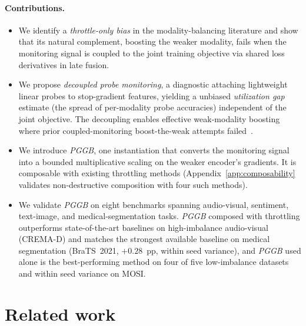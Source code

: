 \documentclass{article}
\begin{document}
\paragraph{Contributions.}
\begin{itemize}
    \item We identify a \emph{throttle-only bias} in the modality-balancing literature and show that its natural complement, boosting the weaker modality, fails when the monitoring signal is coupled to the joint training objective via shared loss derivatives in late fusion.

    \item We propose \emph{decoupled probe monitoring}, a diagnostic attaching lightweight linear probes to stop-gradient features, yielding a unbiased \emph{utilization gap} estimate (the spread of per-modality probe accuracies) independent of the joint objective. The decoupling enables effective weak-modality boosting where prior coupled-monitoring boost-the-weak attempts failed~\citep{wei2024opm}.

    \item We introduce \emph{PGGB}, one instantiation that converts the monitoring signal into a bounded multiplicative scaling on the weaker encoder's gradients. It is composable with existing throttling methods (Appendix~\ref{app:composability} validates non-destructive composition with four such methods).

    \item We validate \emph{PGGB} on eight benchmarks spanning audio-visual, sentiment, text-image, and medical-segmentation tasks. \emph{PGGB} composed with throttling outperforms state-of-the-art baselines on high-imbalance audio-visual (CREMA-D) and matches the strongest available baseline on medical segmentation (BraTS~2021, $+0.28$~pp, within seed variance), and \emph{PGGB} used alone is the best-performing method on four of five low-imbalance datasets and within seed variance on MOSI.
\end{itemize}


\section{Related work}
\label{sec:related}

\end{document}

